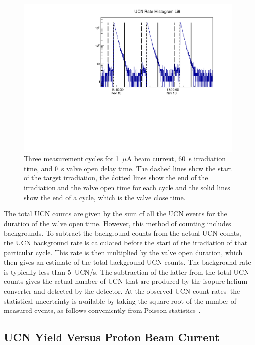 \begin{figure}[h!]
  \centering
  \includegraphics[width=1.0\textwidth]{UCNRate_with_lines_logy.pdf}
  \caption[UCN cycles of measurement]{Three measurement cycles for
    1~$\mu$A beam current, 60~s irradiation time, and 0~s valve open
    delay time. The dashed lines show the start of the target
    irradiation, the dotted lines show the end of the irradiation and
    the valve open time for each cycle and the solid lines show the
    end of a cycle, which is the valve close time.}
  \label{fig:UCNRate_with_lines}
\end{figure}

The total UCN counts are given by the sum of all the UCN events for
the duration of the valve open time. However, this method of counting
includes backgrounds. To subtract the background counts from the
actual UCN counts, the UCN background rate is calculated before the
start of the irradiation of that particular cycle. This rate is then
multiplied by the valve open duration, which then gives an estimate of
the total background UCN counts. The background rate is typically less
than 5~UCN/s. The subtraction of the latter from the total UCN counts
gives the actual number of UCN that are produced by the isopure helium
converter and detected by the detector.  At the observed UCN count
rates, the statistical uncertainty is available by taking the square
root of the number of measured events, as follows conveniently from
Poisson statistics~\cite{pomme2015uncertainty}.
\subsection{UCN Yield Versus Proton Beam Current}

